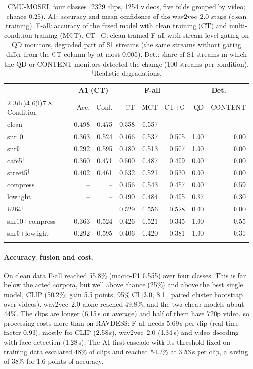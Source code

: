 \begin{table}[t]
\setlength{\tabcolsep}{3.5pt}
\caption{CMU-MOSEI, four classes (2329 clips, 1254 videos, five folds grouped by video; chance 0.25). A1: accuracy and mean confidence of the wav2vec~2.0 stage (clean training). F-all: accuracy of the fused model with clean training (CT) and multi-condition training (MCT). CT+G: clean-trained F-all with stream-level gating on QD monitors, degraded part of S1 streams (the same streams without gating differ from the CT column by at most 0.005). Det.: share of S1 streams in which the QD or CONTENT monitors detected the change (100 streams per condition). $^\dagger$Realistic degradations.}\label{tab:mosei}
\centering\footnotesize
\begin{tabular}{@{}lrrrrrrr@{}}
\toprule
 & \multicolumn{2}{c}{A1 (CT)} & \multicolumn{3}{c}{F-all} & \multicolumn{2}{c}{Det.} \\
\cmidrule(lr){2-3}\cmidrule(lr){4-6}\cmidrule(l){7-8}
Condition & Acc. & Conf. & CT & MCT & CT+G & QD & CONTENT \\
\midrule
clean & 0.498 & 0.475 & 0.558 & 0.557 & -- & -- & -- \\
snr10 & 0.363 & 0.524 & 0.466 & 0.537 & 0.505 & 1.00 & 0.00 \\
snr0 & 0.292 & 0.595 & 0.480 & 0.513 & 0.507 & 1.00 & 0.00 \\
cafe5$^\dagger$ & 0.360 & 0.471 & 0.500 & 0.487 & 0.499 & 0.00 & 0.00 \\
street5$^\dagger$ & 0.402 & 0.461 & 0.532 & 0.521 & 0.530 & 0.00 & 0.00 \\
compress & -- & -- & 0.456 & 0.543 & 0.457 & 0.00 & 0.59 \\
lowlight & -- & -- & 0.490 & 0.484 & 0.495 & 0.87 & 0.30 \\
h264$^\dagger$ & -- & -- & 0.529 & 0.556 & 0.528 & 0.00 & 0.00 \\
snr10+compress & 0.363 & 0.524 & 0.426 & 0.521 & 0.345 & 1.00 & 0.55 \\
snr0+lowlight & 0.292 & 0.595 & 0.406 & 0.420 & 0.381 & 1.00 & 0.31 \\
\botrule
\end{tabular}
\end{table}

\paragraph{Accuracy, fusion and cost.} On clean data F-all reached 55.8\% (macro-F1 0.555) over four classes. This is far below the acted corpora, but well above chance (25\%) and above the best single model, CLIP (50.2\%; gain 5.5 points, 95\% CI [3.0, 8.1], paired cluster bootstrap over videos). wav2vec~2.0 alone reached 49.8\%, and the two cheap models about 44\%. The clips are longer (6.15\,s on average) and half of them have 720p video, so processing costs more than on RAVDESS: F-all needs 5.69\,s per clip (real-time factor 0.93), mostly for CLIP (2.58\,s), wav2vec~2.0 (1.34\,s) and video decoding with face detection (1.28\,s). The A1-first cascade with its threshold fixed on training data escalated 48\% of clips and reached 54.2\% at 3.53\,s per clip, a saving of 38\% for 1.6 points of accuracy.

